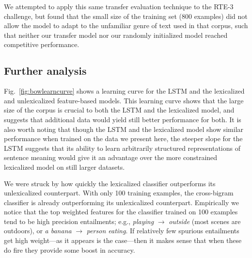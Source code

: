 
We attempted to apply this same transfer evaluation technique to the RTE-3 challenge, but found that the small size of the training set (800 examples) did not allow the model to adapt to the unfamiliar genre of text used in that corpus, such that neither our transfer model nor our randomly initialized model reached competitive performance.

\subsection{Further analysis}

Fig.~\ref{fig:bowlearncurve} shows a learning curve for the LSTM and the lexicalized and unlexicalized feature-based models. This learning curve shows that the large size of the corpus is crucial to both the LSTM and the lexicalized model, and suggests that additional data would yield still better performance for both. It is also worth noting that though the LSTM and the lexicalized model show similar performance when trained on the data we present here, the steeper slope for the LSTM suggests that its ability to learn arbitrarily structured representations of sentence meaning would give it an advantage over the more constrained lexicalized model on still larger datasets.



We were struck by how quickly the lexicalized classifier outperforms its unlexicalized counterpart.
With only 100 training examples, the cross-bigram classifier is already outperforming its unlexicalized counterpart.
Empirically we notice that the top weighted features for the classifier
  trained on 100 examples tend to be high precision entailments;
  e.g.,
  \textit{playing} $\rightarrow$ \textit{outside}
  (most scenes are outdoors), or \textit{a banana} $\rightarrow$
  \textit{person eating}.
If relatively few spurious entailments get high weight---as it appears
  is the case---then it makes sense that when these do fire they
  provide some boost in accuracy.
  
